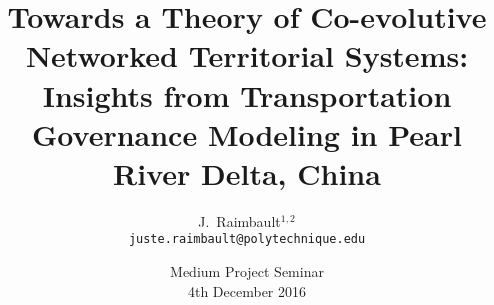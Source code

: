 \documentclass[english,11pt]{beamer}
\begin{document}
\title{Towards a Theory of Co-evolutive Networked Territorial Systems: Insights from Transportation Governance Modeling in Pearl River Delta, China}

\author{J.~Raimbault$^{1,2}$\\
\texttt{juste.raimbault@polytechnique.edu}
}




\date{Medium Project Seminar\\\smallskip
4th December 2016
}

\frame{\maketitle}






\end{document}
